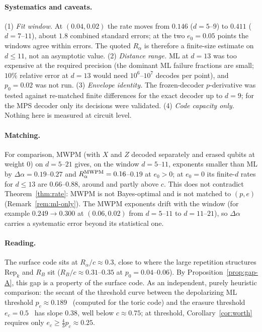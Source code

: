 \documentclass[11pt,a4paper]{article}
\theoremstyle{plain}
\theoremstyle{definition}
\theoremstyle{remark}
\newcommand{\Rep}{\mathrm{Rep}}
\begin{document}
\paragraph{Systematics and caveats.}
(1) \emph{Fit window.} At $(0.04,0.02)$ the rate moves from $0.146$ ($d=5$--$9$) to $0.411$ ($d=7$--$11$), about $1.8$ combined standard errors; at the two $e_0=0.05$ points the windows agree within errors. The quoted $R_\alpha$ is therefore a finite-size estimate on $d\le11$, not an asymptotic value. (2) \emph{Distance range.} ML at $d=13$ was too expensive at the required precision (the dominant ML failure fractions are small; $10\%$ relative error at $d=13$ would need $10^6$--$10^7$ decodes per point), and $p_0=0.02$ was not run. (3) \emph{Envelope identity.} The frozen-decoder $p$-derivative was tested against re-matched finite differences for the exact decoder up to $d=9$; for the MPS decoder only its decisions were validated. (4) \emph{Code capacity only.} Nothing here is measured at circuit level.

\paragraph{Matching.} For comparison, MWPM (with $X$ and $Z$ decoded separately and erased qubits at weight $0$) on $d=5$--$21$ gives, on the window $d=5$--$11$, exponents smaller than ML by $\Delta\alpha=0.19$--$0.27$ and $R_\alpha^{\rm MWPM}=0.16$--$0.19$ at $e_0>0$; at $e_0=0$ its finite-$d$ rates for $d\le13$ are $0.66$--$0.88$, around and partly above $c$. This does not contradict Theorem~\ref{thm:rate}: MWPM is not Bayes-optimal and is not matched to $(p,e)$ (Remark~\ref{rem:ml-only}). The MWPM exponents drift with the window (for example $0.249\to0.300$ at $(0.06,0.02)$ from $d=5$--$11$ to $d=11$--$21$), so $\Delta\alpha$ carries a systematic error beyond its statistical one.

\paragraph{Reading.} The surface code sits at $R_\alpha/c\approx0.3$, close to where the large repetition structures $\Rep_k$ and $R_B$ sit ($R_B/c\approx0.31$--$0.35$ at $p_0=0.04$--$0.06$). By Proposition~\ref{prop:gap-A}, this gap is a property of the surface code. As an independent, purely heuristic comparison: the secant of the threshold curve between the depolarizing ML threshold $p_c\approx0.189$~\cite{Bombin} (computed for the toric code) and the erasure threshold $e_c=0.5$~\cite{SBD} has slope $0.38$, well below $c\approx0.75$; at threshold, Corollary~\ref{cor:worth} requires only $e_c\ge\tfrac43p_c\approx0.25$.
\end{document}
